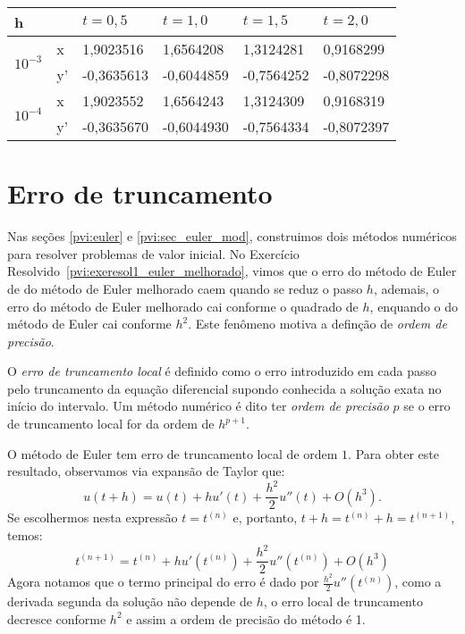 \begin{resp} \begin{center}
 \begin{tabular}{|l|l|l|l|l|l|}%
\hline
   h&&$t=0,5$&$t=1,0$&$t=1,5$&$t=2,0$\\
   \hline
   \multirow{2}{*}{$10^{-3}$} &x & 1,9023516 &1,6564208&1,3124281&0,9168299\\
		              &y'& -0,3635613&-0,6044859&-0,7564252& -0,8072298\\			
   \hline

   \multirow{2}{*}{$10^{-4}$} &x & 1,9023552 & 1,6564243 & 1,3124309 & 0,9168319\\
		              &y'& -0,3635670&-0,6044930&-0,7564334& -0,8072397 \\			
   \hline
   
   \end{tabular}
\end{center}
 
\end{resp}



\section{Erro de truncamento}\label{pvi:erro_truncamento}
Nas seções \ref{pvi:euler} e \ref{pvi:sec_euler_mod}, construimos dois métodos numéricos para resolver problemas de valor inicial. No Exercício Resolvido~\ref{pvi:exeresol1_euler_melhorado}, vimos que o erro do método de Euler de do método de Euler melhorado caem quando se reduz o passo $h$, ademais, o erro do método de Euler melhorado cai conforme o quadrado de $h$, enquando o do método de Euler cai conforme $h^2$. Este fenômeno motiva a definção de \emph{ordem de precisão}.

\begin{defn} O \emph{erro de truncamento local} é definido como o erro introduzido em cada passo pelo truncamento da equação diferencial supondo conhecida a solução exata no início do intervalo. Um método numérico é dito ter \emph{ordem de precisão} $p$ se o erro de truncamento local for da ordem de $h^{p+1}$.
\end{defn}
\begin{ex} O método de Euler tem erro de truncamento local de ordem $1$. Para obter este resultado, observamos via expansão de Taylor que:
$$u(t+h)=u(t)+hu'(t)+\frac{h^2}{2}u''(t)+O(h^3).$$
Se escolhermos nesta expressão $t=t^{(n)}$ e, portanto, $t+h=t^{(n)}+h=t^{(n+1)}$, temos:
$$t^{(n+1)}=t^{(n)}+hu'(t^{(n)})+\frac{h^2}{2}u''(t^{(n)})+O(h^3)$$
Agora notamos que o termo principal do erro é dado por $\frac{h^2}{2}u''(t^{(n)})$, como a derivada segunda da solução não depende de $h$, o erro local de truncamento decresce conforme $h^2$ e assim a ordem de precisão do método é 1.
\end{ex}

